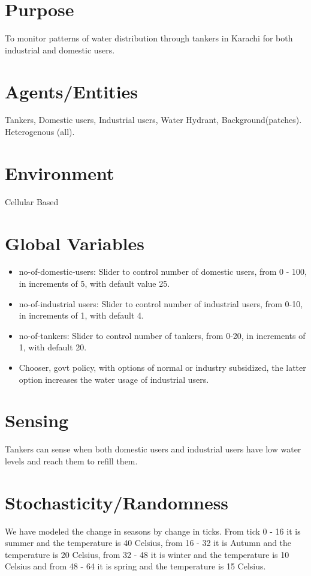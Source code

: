 \documentclass{article}
\begin{document}
\section*{Purpose}
To monitor patterns of water distribution through tankers in Karachi for both industrial and domestic users. 

\section*{Agents/Entities}
Tankers, Domestic users, Industrial users, Water Hydrant, Background(patches). Heterogenous (all).

\section*{Environment}
Cellular Based

\section*{Global Variables}
\begin{itemize}
    \item no-of-domestic-users: Slider to control number of domestic users, from 0 - 100, in increments of 5, with default value 25. 
    \item no-of-industrial users: Slider to control number of industrial users, from 0-10, in increments of 1, with default 4. 
    \item no-of-tankers: Slider to control number of tankers, from 0-20, in increments of 1, with default 20. 
    \item Chooser, govt policy, with options of normal or industry subsidized, the latter option increases the water usage of industrial users.
\end{itemize}

\section*{Sensing}
Tankers can sense when both domestic users and industrial users have low water levels and reach them to refill them.

\section*{Stochasticity/Randomness}
We have modeled the change in seasons by change in ticks. From tick 0 - 16 it is summer and the temperature is 40 Celsius, from 16 - 32 it is Autumn and the temperature is 20 Celsius, from 32 - 48 it is winter and the temperature is 10 Celsius and from 48 - 64 it is spring and the temperature is 15 Celsius. 
\end{document}
